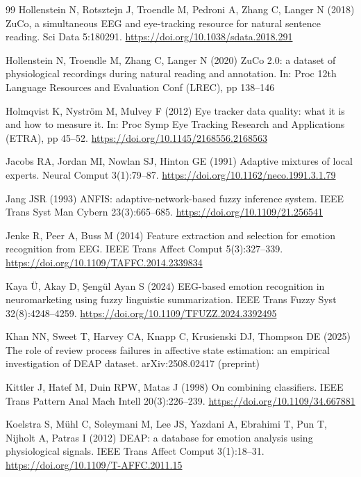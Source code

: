 \begin{thebibliography}{99}
 Hollenstein N, Rotsztejn J, Troendle M, Pedroni A, Zhang C, Langer N (2018) ZuCo, a simultaneous EEG and eye-tracking resource for natural sentence reading. Sci Data 5:180291. \url{https://doi.org/10.1038/sdata.2018.291}

 Hollenstein N, Troendle M, Zhang C, Langer N (2020) ZuCo 2.0: a dataset of physiological recordings during natural reading and annotation. In: Proc 12th Language Resources and Evaluation Conf (LREC), pp 138--146

 Holmqvist K, Nystr\"om M, Mulvey F (2012) Eye tracker data quality: what it is and how to measure it. In: Proc Symp Eye Tracking Research and Applications (ETRA), pp 45--52. \url{https://doi.org/10.1145/2168556.2168563}

 Jacobs RA, Jordan MI, Nowlan SJ, Hinton GE (1991) Adaptive mixtures of local experts. Neural Comput 3(1):79--87. \url{https://doi.org/10.1162/neco.1991.3.1.79}

 Jang JSR (1993) ANFIS: adaptive-network-based fuzzy inference system. IEEE Trans Syst Man Cybern 23(3):665--685. \url{https://doi.org/10.1109/21.256541}

 Jenke R, Peer A, Buss M (2014) Feature extraction and selection for emotion recognition from EEG. IEEE Trans Affect Comput 5(3):327--339. \url{https://doi.org/10.1109/TAFFC.2014.2339834}

 Kaya \"U, Akay D, \c{S}eng\"ul Ayan S (2024) EEG-based emotion recognition in neuromarketing using fuzzy linguistic summarization. IEEE Trans Fuzzy Syst 32(8):4248--4259. \url{https://doi.org/10.1109/TFUZZ.2024.3392495}

 Khan NN, Sweet T, Harvey CA, Knapp C, Krusienski DJ, Thompson DE (2025) The role of review process failures in affective state estimation: an empirical investigation of DEAP dataset. arXiv:2508.02417 (preprint)

 Kittler J, Hatef M, Duin RPW, Matas J (1998) On combining classifiers. IEEE Trans Pattern Anal Mach Intell 20(3):226--239. \url{https://doi.org/10.1109/34.667881}

 Koelstra S, M\"uhl C, Soleymani M, Lee JS, Yazdani A, Ebrahimi T, Pun T, Nijholt A, Patras I (2012) DEAP: a database for emotion analysis using physiological signals. IEEE Trans Affect Comput 3(1):18--31. \url{https://doi.org/10.1109/T-AFFC.2011.15}


\end{thebibliography}
